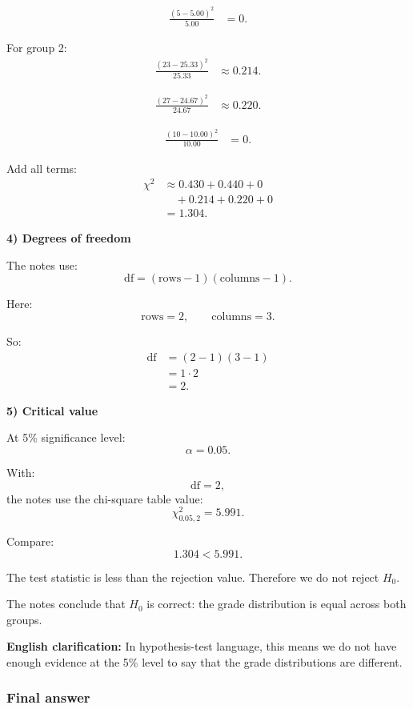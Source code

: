 \documentclass[10pt]{article}
\begin{document}
\begin{align*}
\frac{(5-5.00)^2}{5.00}
&=0.
\end{align*}

For group 2:
\begin{align*}
\frac{(23-25.33)^2}{25.33}
&\approx 0.214.
\end{align*}

\begin{align*}
\frac{(27-24.67)^2}{24.67}
&\approx 0.220.
\end{align*}

\begin{align*}
\frac{(10-10.00)^2}{10.00}
&=0.
\end{align*}

Add all terms:
\begin{align*}
\chi^2
&\approx
0.430+0.440+0
\\
&\quad
+0.214+0.220+0
\\[2mm]
&=
1.304.
\end{align*}

\textbf{4) Degrees of freedom}

The notes use:
\[
\text{df}
=
(\text{rows}-1)(\text{columns}-1).
\]

Here:
\[
\text{rows}=2,
\qquad
\text{columns}=3.
\]

So:
\begin{align*}
\text{df}
&=
(2-1)(3-1)
\\[2mm]
&=
1\cdot 2
\\[2mm]
&=2.
\end{align*}

\textbf{5) Critical value}

At 5\% significance level:
\[
\alpha=0.05.
\]

With:
\[
\text{df}=2,
\]
the notes use the chi-square table value:
\[
\chi^2_{0.05,2}=5.991.
\]

Compare:
\[
1.304<5.991.
\]

The test statistic is less than the rejection value.
Therefore we do not reject \(H_0\).

The notes conclude that \(H_0\) is correct:
the grade distribution is equal across both groups.

\textbf{English clarification:}
In hypothesis-test language, this means we do not
have enough evidence at the 5\% level to say that
the grade distributions are different.

\subsubsection*{Final answer}
\end{document}

